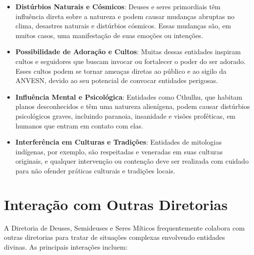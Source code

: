 \begin{itemize}
    \item \textbf{Distúrbios Naturais e Cósmicos}: Deuses e seres primordiais têm influência direta sobre a natureza e podem causar mudanças abruptas no clima, desastres naturais e distúrbios cósmicos. Essas mudanças são, em muitos casos, uma manifestação de suas emoções ou intenções.
    \item \textbf{Possibilidade de Adoração e Cultos}: Muitas dessas entidades inspiram cultos e seguidores que buscam invocar ou fortalecer o poder do ser adorado. Esses cultos podem se tornar ameaças diretas ao público e ao sigilo da ANVESN, devido ao seu potencial de convocar entidades perigosas.
    \item \textbf{Influência Mental e Psicológica}: Entidades como Cthulhu, que habitam planos desconhecidos e têm uma natureza alienígena, podem causar distúrbios psicológicos graves, incluindo paranoia, insanidade e visões proféticas, em humanos que entram em contato com elas.
    \item \textbf{Interferência em Culturas e Tradições}: Entidades de mitologias indígenas, por exemplo, são respeitadas e veneradas em suas culturas originais, e qualquer intervenção ou contenção deve ser realizada com cuidado para não ofender práticas culturais e tradições locais.
\end{itemize}

\section{Interação com Outras Diretorias}

A Diretoria de Deuses, Semideuses e Seres Míticos frequentemente colabora com outras diretorias para tratar de situações complexas envolvendo entidades divinas. As principais interações incluem:

